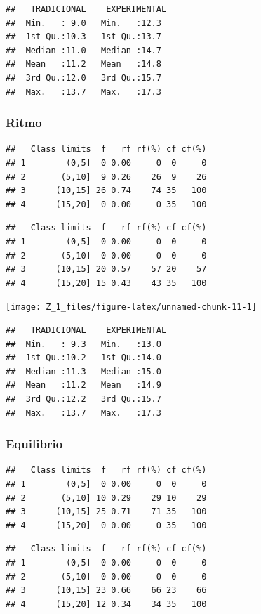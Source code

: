 \documentclass[12pt,]{report}
\begin{document}
\begin{verbatim}
##   TRADICIONAL    EXPERIMENTAL 
##  Min.   : 9.0   Min.   :12.3  
##  1st Qu.:10.3   1st Qu.:13.7  
##  Median :11.0   Median :14.7  
##  Mean   :11.2   Mean   :14.8  
##  3rd Qu.:12.0   3rd Qu.:15.7  
##  Max.   :13.7   Max.   :17.3
\end{verbatim}

\hypertarget{ritmo}{%
\subsubsection{Ritmo}\label{ritmo}}

\begin{verbatim}
##   Class limits  f   rf rf(%) cf cf(%)
## 1        (0,5]  0 0.00     0  0     0
## 2       (5,10]  9 0.26    26  9    26
## 3      (10,15] 26 0.74    74 35   100
## 4      (15,20]  0 0.00     0 35   100
\end{verbatim}

\begin{verbatim}
##   Class limits  f   rf rf(%) cf cf(%)
## 1        (0,5]  0 0.00     0  0     0
## 2       (5,10]  0 0.00     0  0     0
## 3      (10,15] 20 0.57    57 20    57
## 4      (15,20] 15 0.43    43 35   100
\end{verbatim}

\begin{center}\texttt{[image: Z\_1\_files/figure-latex/unnamed-chunk-11-1]} \end{center}

\begin{verbatim}
##   TRADICIONAL    EXPERIMENTAL 
##  Min.   : 9.3   Min.   :13.0  
##  1st Qu.:10.2   1st Qu.:14.0  
##  Median :11.3   Median :15.0  
##  Mean   :11.2   Mean   :14.9  
##  3rd Qu.:12.2   3rd Qu.:15.7  
##  Max.   :13.7   Max.   :17.3
\end{verbatim}

\hypertarget{equilibrio}{%
\subsubsection{Equilibrio}\label{equilibrio}}

\begin{verbatim}
##   Class limits  f   rf rf(%) cf cf(%)
## 1        (0,5]  0 0.00     0  0     0
## 2       (5,10] 10 0.29    29 10    29
## 3      (10,15] 25 0.71    71 35   100
## 4      (15,20]  0 0.00     0 35   100
\end{verbatim}

\begin{verbatim}
##   Class limits  f   rf rf(%) cf cf(%)
## 1        (0,5]  0 0.00     0  0     0
## 2       (5,10]  0 0.00     0  0     0
## 3      (10,15] 23 0.66    66 23    66
## 4      (15,20] 12 0.34    34 35   100
\end{verbatim}
\end{document}
